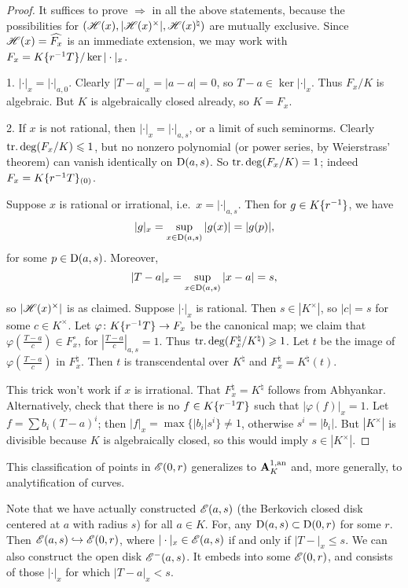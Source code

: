 \begin{proof}
It suffices to prove $\Rightarrow$ in all the above statements, because the 
possibilities for $(\mathscr{H}(x),|\mathscr{H}(x)^\times|,\mathscr{H}(x)^\natural)$ are mutually 
exclusive. Since $\mathscr{H}(x)=\widehat{F_x}$ is an immediate extension, we may work 
with $F_x=K\{ r^{-1}T \}/\ker|\cdot|_x$. 

1. $|\cdot|_x=|\cdot|_{a,0}$. Clearly $|T-a|_x=|a-a|=0$, so 
$T-a\in \ker|\cdot|_x$. Thus $F_x/K$ is algebraic. But $K$ is algebraically 
closed already, so $K=F_x$. 

2. If $x$ is not rational, then $|\cdot|_x=|\cdot|_{a,s}$, or a limit of 
such seminorms. Clearly $\operatorname{tr.deg}(F_x/K)\leqslant 1$, but no nonzero polynomial 
(or power series, by Weierstrass' theorem) can vanish identically on 
$\operatorname{D}(a,s)$. So $\operatorname{tr.deg}(F_x/K)=1$; indeed $F_x=K\{ r^{-1} T \}_{(0)}$. 

Suppose $x$ is rational or irrational, i.e.~$x=|\cdot|_{a,s}$. Then for 
$g\in K\{ r^{-1} \}$, we have 
\[
	|g|_x = \sup_{x\in \operatorname{D}(a,s)} |g(x)| = |g(p)| ,
\]
for some $p\in \operatorname{D}(a,s)$. Moreover, 
\[
	|T-a|_x = \sup_{x\in \operatorname{D}(a,s)} |x-a| = s ,
\]
so $|\mathscr{H}(x)^\times|$ is as claimed. Suppose $|\cdot|_x$ is rational. Then 
$s\in |K^\times|$, so $|c|=s$ for some $c\in K^\times$. Let 
$\varphi\colon K\{ r^{-1} T \}\to F_x$ be the canonical map; we claim that 
$\varphi(\frac{T-a}{c})\in F_x^\circ$, for $|\frac{T-a}{c}|_{a,s}=1$. Thus 
$\operatorname{tr.deg}(F_x^\natural/K^\natural)\geqslant 1$. Let $t$ be the image of 
$\varphi(\frac{T-a}{c})$ in $F_x^\natural$. Then $t$ is transcendental over 
$K^\natural$ and $F_x^\natural = K^\natural(t)$. 

This trick won't work if $x$ is irrational. That $F_x^\natural=K^\natural$ 
follows from Abhyankar. Alternatively, check that there is no 
$f\in K\{ r^{-1} T \}$ such that $|\varphi(f)|_x=1$. Let 
$f=\sum b_i (T-a)^i$; then $|f|_x = \max \{|b_i| s^i\}\ne 1$, otherwise 
$s^i=|b_i|$. But $|K^\times|$ is divisible because $K$ is algebraically closed, 
so this would imply $s\in |K^\times|$. 
\end{proof}

This classification of points in $\mathscr{E}(0,r)$ generalizes to 
$\mathbf{A}_K^{1,\mathrm{an}}$ and, more generally, to analytification of curves. 

Note that we have actually constructed $\mathscr{E}(a,s)$ (the Berkovich closed disk 
centered at $a$ with radius $s$) for all $a\in K$. For, any 
$\operatorname{D}(a,s)\subset \operatorname{D}(0,r)$ for some $r$. Then 
$\mathscr{E}(a,s)\hookrightarrow \mathscr{E}(0,r)$, where $|\cdot|_x\in \mathscr{E}(a,s)$ if and only 
if $|T-|_x \leqslant s$. We can also construct the open disk $\mathscr{E}^-(a,s)$. 
It embeds into some $\mathscr{E}(0,r)$, and consists of those $|\cdot|_x$ for which 
$|T-a|_x < s$. 

